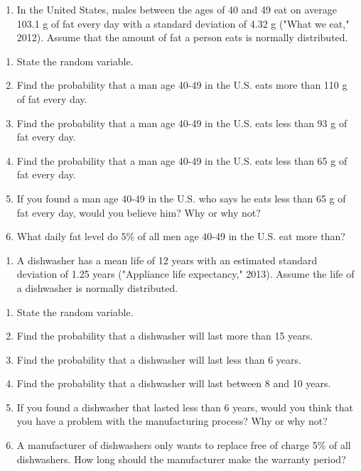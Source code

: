 \documentclass[]{book}
\providecommand{\tightlist}{%
  \setlength{\itemsep}{0pt}\setlength{\parskip}{0pt}}
\begin{document}
\begin{enumerate}
\def\labelenumi{\arabic{enumi}.}
\setcounter{enumi}{6}
\tightlist
\item
  In the United States, males between the ages of 40 and 49 eat on average 103.1 g of fat every day with a standard deviation of 4.32 g ("What we eat," 2012). Assume that the amount of fat a person eats is normally distributed.
\end{enumerate}

\begin{enumerate}
\def\labelenumi{\alph{enumi}.}
\tightlist
\item
  State the random variable.
\item
  Find the probability that a man age 40-49 in the U.S. eats more than 110 g of fat every day.
\item
  Find the probability that a man age 40-49 in the U.S. eats less than 93 g of fat every day.
\item
  Find the probability that a man age 40-49 in the U.S. eats less than 65 g of fat every day.
\item
  If you found a man age 40-49 in the U.S. who says he eats less than 65 g of fat every day, would you believe him? Why or why not?
\item
  What daily fat level do 5\% of all men age 40-49 in the U.S. eat more than?
\end{enumerate}

\begin{enumerate}
\def\labelenumi{\arabic{enumi}.}
\setcounter{enumi}{7}
\tightlist
\item
  A dishwasher has a mean life of 12 years with an estimated standard deviation of 1.25 years ("Appliance life expectancy," 2013). Assume the life of a dishwasher is normally distributed.
\end{enumerate}

\begin{enumerate}
\def\labelenumi{\alph{enumi}.}
\tightlist
\item
  State the random variable.
\item
  Find the probability that a dishwasher will last more than 15 years.
\item
  Find the probability that a dishwasher will last less than 6 years.
\item
  Find the probability that a dishwasher will last between 8 and 10 years.
\item
  If you found a dishwasher that lasted less than 6 years, would you think that you have a problem with the manufacturing process? Why or why not?
\item
  A manufacturer of dishwashers only wants to replace free of charge 5\% of all dishwashers. How long should the manufacturer make the warranty period?
\end{enumerate}
\end{document}
